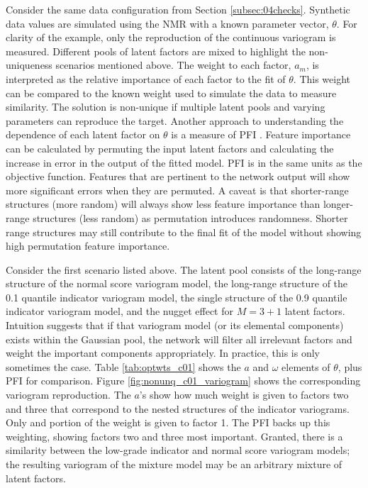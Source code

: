 Consider the same data configuration from Section \ref{subsec:04checks}. Synthetic data values are simulated using the \gls{NMR} with a known parameter vector, $\theta$. For clarity of the example, only the reproduction of the continuous variogram is measured. Different pools of latent factors are mixed to highlight the non-uniqueness scenarios mentioned above. The weight to each factor, $a_{m}$, is interpreted as the relative importance of each factor to the fit of $\theta$. This weight can be compared to the known weight used to simulate the data to measure similarity. The solution is non-unique if multiple latent pools and varying parameters can reproduce the target. Another approach to understanding the dependence of each latent factor on $\theta$ is a measure of \gls{PFI} \citep{fisher2019all}. Feature importance can be calculated by permuting the input latent factors and calculating the increase in error in the output of the fitted model. \gls{PFI} is in the same units as the objective function. Features that are pertinent to the network output will show more significant errors when they are permuted. A caveat is that shorter-range structures (more random) will always show less feature importance than longer-range structures (less random) as permutation introduces randomness. Shorter range structures may still contribute to the final fit of the model without showing high permutation feature importance.

Consider the first scenario listed above. The latent pool consists of the long-range structure of the normal score variogram model, the long-range structure of the 0.1 quantile indicator variogram model, the single structure of the 0.9 quantile indicator variogram model, and the nugget effect for $M = 3+1$ latent factors. Intuition suggests that if that variogram model (or its elemental components) exists within the Gaussian pool, the network will filter all irrelevant factors and weight the important components appropriately. In practice, this is only sometimes the case. Table \ref{tab:optwts_c01} shows the $a$ and $\omega$ elements of $\theta$, plus \gls{PFI} for comparison. Figure \ref{fig:nonunq_c01_variogram} shows the corresponding variogram reproduction. The $a$'s show how much weight is given to factors two and three that correspond to the nested structures of the indicator variograms. Only and portion of the weight is given to factor 1. The \gls{PFI} backs up this weighting, showing factors two and three most important. Granted, there is a similarity between the low-grade indicator and normal score variogram models; the resulting variogram of the mixture model may be an arbitrary mixture of latent factors.

